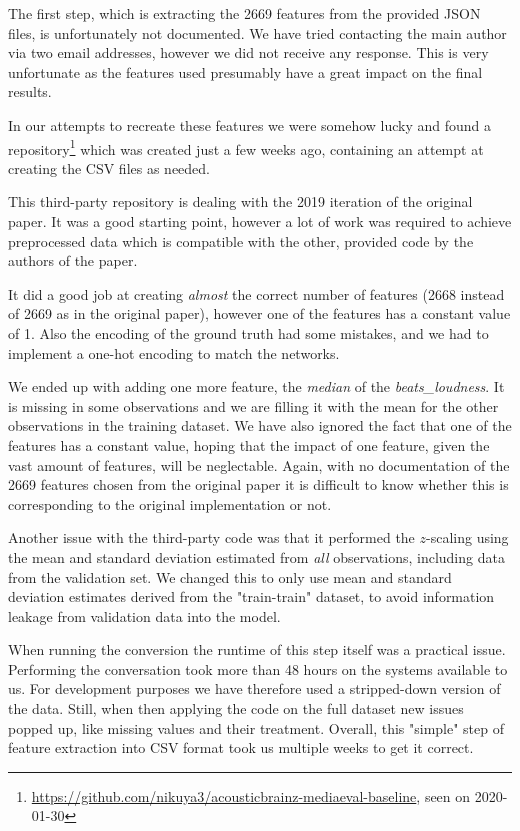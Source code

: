 \documentclass[sigconf,nonacm]{acmart}
\begin{document}
The first step, which is extracting the 2669 features from the provided
JSON files, is unfortunately not documented.
We have tried contacting the main author via two email addresses,
however we did not receive any response.
This is very unfortunate as the features used presumably have a great
impact on the final results.

In our attempts to recreate these features
we were somehow lucky and found a
repository\footnote{\url{https://github.com/nikuya3/acousticbrainz-mediaeval-baseline}, seen on 2020-01-30}
which was created just a few weeks ago, containing an
attempt at creating the CSV files as needed.

This third-party repository is dealing with the 2019 iteration
of the original paper.
It was a good starting point, however a lot of
work was required to achieve preprocessed data which is
compatible with the other, provided code by the authors of the paper.

It did a good job at creating \emph{almost} the correct number
of features (2668 instead of 2669 as in the original paper),
however one of the features has a constant value of 1.
Also the encoding of the ground truth had some mistakes, and we
had to implement a one-hot encoding to match the networks.

We ended up with adding one more feature, the \emph{median}
of the \emph{beats\_loudness}.
It is missing in some observations and we are filling it with the mean
for the other observations in the training dataset.
We have also ignored the fact that one of the features has a constant value,
hoping that the impact of one feature, given the vast amount of features,
will be neglectable.
Again, with no documentation of the 2669 features chosen from the original
paper it is difficult to know whether this is corresponding to the
original implementation or not.

Another issue with the third-party code was that it performed the
$z$-scaling using the mean and standard deviation estimated
from \emph{all} observations,
including data from the validation set.
We changed this to only use mean and standard deviation estimates
derived from the "train-train" dataset, to avoid information
leakage from validation data into the model.

When running the conversion the runtime of this step itself was
a practical issue.
Performing the conversation took more than 48 hours on the systems
available to us.
For development purposes we have therefore used a stripped-down
version of the data.
Still, when then applying the code on the full dataset new
issues popped up, like missing values and their treatment.
Overall, this "simple" step of feature extraction into CSV
format took us multiple weeks to get it correct.
\end{document}

